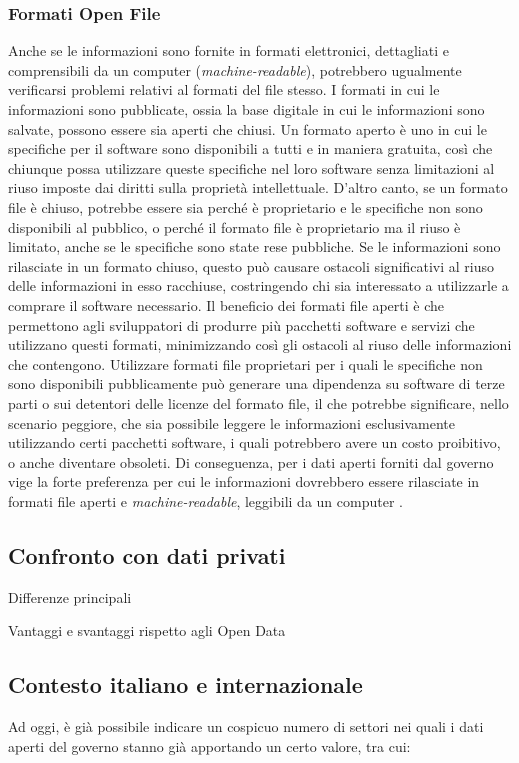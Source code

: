 \subsubsection{Formati Open File}
Anche se le informazioni sono fornite in formati elettronici, dettagliati e comprensibili da un computer (\textit{machine-readable}), potrebbero ugualmente verificarsi problemi relativi al formati del file stesso. I formati in cui le informazioni sono pubblicate, ossia la base digitale in cui le informazioni sono salvate, possono essere sia aperti che chiusi. Un formato aperto è uno in cui le specifiche per il software sono disponibili a tutti e in maniera gratuita, così che chiunque possa utilizzare queste specifiche nel loro software senza limitazioni al riuso imposte dai diritti sulla proprietà intellettuale. D'altro canto, se un formato file è chiuso, potrebbe essere sia perché è proprietario e le specifiche non sono disponibili al pubblico, o perché il formato file è proprietario ma il riuso è limitato, anche se le specifiche sono state rese pubbliche. Se le informazioni sono rilasciate in un formato chiuso, questo può causare ostacoli significativi al riuso delle informazioni in esso racchiuse, costringendo chi sia interessato a utilizzarle a comprare il software necessario. Il beneficio dei formati file aperti è che permettono agli sviluppatori di produrre più pacchetti software e servizi che utilizzano questi formati, minimizzando così gli ostacoli al riuso delle informazioni che contengono. Utilizzare formati file proprietari per i quali le specifiche non sono disponibili pubblicamente può generare una dipendenza su software di terze parti o sui detentori delle licenze del formato file, il che potrebbe significare, nello scenario peggiore, che sia possibile leggere le informazioni esclusivamente utilizzando certi pacchetti software, i quali potrebbero avere un costo proibitivo, o anche diventare obsoleti. Di conseguenza, per i dati aperti forniti dal governo vige la forte preferenza per cui le informazioni dovrebbero essere rilasciate in formati file aperti e \textit{machine-readable}, leggibili da un computer \cite{OpenDataHandbook_FileFormats}.

\subsection{Confronto con dati privati}
Differenze principali

Vantaggi e svantaggi rispetto agli Open Data

\subsection{Contesto italiano e internazionale}
Ad oggi, è già possibile indicare un cospicuo numero di settori nei quali i dati aperti del governo stanno già apportando un certo valore, tra cui:

